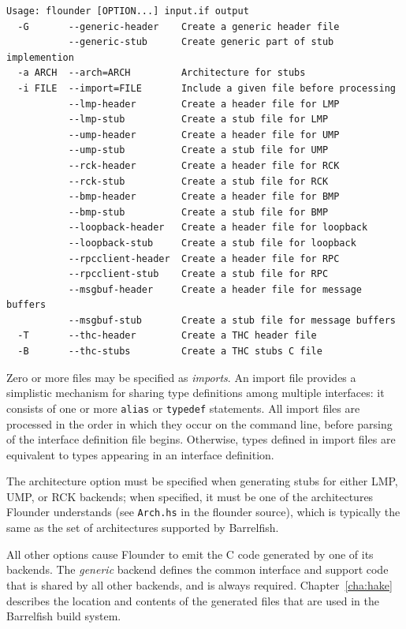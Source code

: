 \documentclass[a4paper,twoside]{report} %
\begin{document}
\begin{verbatim}
Usage: flounder [OPTION...] input.if output
  -G       --generic-header    Create a generic header file
           --generic-stub      Create generic part of stub implemention
  -a ARCH  --arch=ARCH         Architecture for stubs
  -i FILE  --import=FILE       Include a given file before processing
           --lmp-header        Create a header file for LMP
           --lmp-stub          Create a stub file for LMP
           --ump-header        Create a header file for UMP
           --ump-stub          Create a stub file for UMP
           --rck-header        Create a header file for RCK
           --rck-stub          Create a stub file for RCK
           --bmp-header        Create a header file for BMP
           --bmp-stub          Create a stub file for BMP
           --loopback-header   Create a header file for loopback
           --loopback-stub     Create a stub file for loopback
           --rpcclient-header  Create a header file for RPC
           --rpcclient-stub    Create a stub file for RPC
           --msgbuf-header     Create a header file for message buffers
           --msgbuf-stub       Create a stub file for message buffers
  -T       --thc-header        Create a THC header file
  -B       --thc-stubs         Create a THC stubs C file
\end{verbatim}

Zero or more files may be specified as \emph{imports}. An import file
provides a simplistic mechanism for sharing type definitions among multiple
interfaces: it consists of one or more \texttt{alias} or \texttt{typedef}
statements. All import files are processed in the order in which they occur on
the command line, before parsing of the interface definition file begins.
Otherwise, types defined in import files are equivalent to types appearing in
an interface definition.

The architecture option must be specified when generating stubs for either LMP,
UMP, or RCK backends; when specified, it must be one of the architectures
Flounder understands (see \texttt{Arch.hs} in the flounder source), which is
typically the same as the set of architectures supported by Barrelfish.

All other options cause Flounder to emit the C code generated by one of its
backends. The \emph{generic} backend defines the common interface and support
code that is shared by all other backends, and is always required.
Chapter~\ref{cha:hake} describes the location and contents of the generated
files that are used in the Barrelfish build system.
\end{document}
